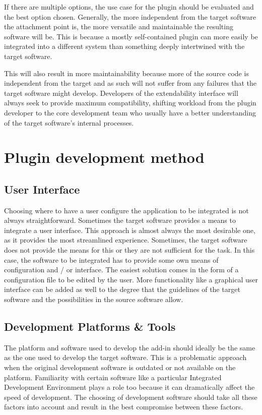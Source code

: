 \documentclass[BSA,Bachelor,english]{twbook}%
\begin{document}
If there are multiple options, the use case for the plugin should be evaluated and the best option chosen. Generally, the more independent from the target software the attachment point is, the more versatile and maintainable the resulting software will be. This is because a mostly self-contained plugin can more easily be integrated into a different system than something deeply intertwined with the target software.

This will also result in more maintainability because more of the source code is independent from the target and as such will not suffer from any failures that the target software might develop. Developers of the extendability interface will always seek to provide maximum compatibility, shifting workload from the plugin developer to the core development team who usually have a better understanding of the target software's internal processes.


\chapter{Plugin development method}


\section{User Interface}

Choosing where to have a user configure the application to be integrated is not always straightforward. Sometimes the target software provides a means to integrate a user interface. This approach is almost always the most desirable one, as it provides the most streamlined experience. Sometimes, the target software does not provide the means for this or they are not sufficient for the task. In this case, the software to be integrated has to provide some own means of configuration and / or interface. The easiest solution comes in the form of a configuration file to be edited by the user. More functionality like a graphical user interface can be added as well to the degree that the guidelines of the target software and the possibilities in the source software allow.

\section{Development Platforms \& Tools}

The platform and software used to develop the add-in should ideally be the same as the one used to develop the target software. This is a problematic approach when the original development software is outdated or not available on the platform. Familiarity with certain software like a particular Integrated Development Environment plays a role too because it can dramatically affect the speed of development. The choosing of development software should take all these factors into account and result in the best compromise between these factors.
\end{document}
